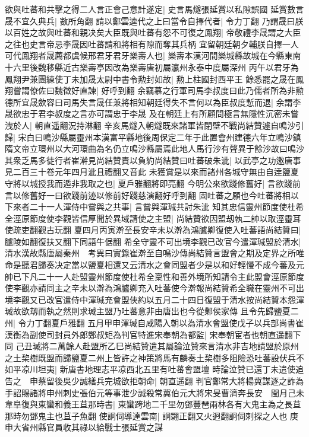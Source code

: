 欲與吐蕃和共擊之得二人言正會己意計遂定|{
	史言馬燧張延賞以私隙誤國}
延賞數言晟不宜久典兵|{
	數所角翻}
請以鄭雲逵代之上曰當令自擇代者|{
	令力丁翻}
乃謂晟曰朕以百姓之故與吐蕃和親决矣大臣既與吐蕃有怨不可復之鳳翔|{
	帝敬禮李晟謂之大臣之往也史言帝忌李晟因吐蕃請和將相有隙而奪其兵柄}
宜留朝廷朝夕輔朕自擇一人可代鳳翔者晟薦都虞候邢君牙君牙樂壽人也|{
	樂壽本漢河間樂城縣故城在今縣東南十六里後魏移縣近古樂壽亭因改為樂壽唐初屬瀛州永泰中度屬深州}
丙午以君牙為鳳翔尹兼團練使丁未加晟太尉中書令勲封如故|{
	勲上柱國封西平王}
餘悉罷之晟在鳳翔嘗謂僚佐曰魏徵好直諫|{
	好呼到翻}
余竊慕之行軍司馬李叔度曰此乃儒者所為非勲德所宜晟歛容曰司馬失言晟任兼將相知朝廷得失不言何以為臣叔度慙而退|{
	余謂李晟欲忠于君李叔度之言亦可謂忠于李晟}
及在朝廷上有所顧問極言無隱性沉密未嘗洩於人|{
	朝直遥翻況持淋翻}
辛亥馬燧入朝燧既來諸軍皆閉壁不戰尚結贊遽自鳴沙引歸|{
	宋白曰鳴沙縣屬靈州本漢富平縣地後周保定二年于此置會州建德六年立鳴沙鎮隋文帝立環州以大河環曲為名仍立鳴沙縣屬焉此地人馬行沙有聲異于餘沙故曰鳴沙}
其衆乏馬多徒行者崔澣見尚結贊責以負約尚結贊曰吐蕃破朱泚|{
	以武亭之功邀唐事見二百三十卷元年四月泚且禮翻又音此}
未獲賞是以來而諸州各城守無由自逹鹽夏守將以城授我而遁非我取之也|{
	夏戶雅翻將即亮翻}
今明公來欲踐修舊好|{
	言欲踐前言以修舊好一曰欲踐前迹以修前好踐慈演翻好呼到翻}
固吐蕃之願也今吐蕃將相以下來者二十一人渾侍中嘗與之共事|{
	言嘗與渾瑊共討朱泚}
知其忠信靈州節度使杜希全涇原節度使李觀皆信厚聞於異域請使之主盟|{
	尚結贊欲因盟刼執二帥以取涇靈耳使疏吏翻觀古玩翻}
夏四月丙寅澣至長安辛未以澣為鴻臚卿復使入吐蕃語尚結贊曰|{
	臚陵如翻復扶又翻下同語牛倨翻}
希全守靈不可出境李觀已改官今遣渾瑊盟於清水|{
	清水漢故縣唐屬秦州　考異曰實錄崔澣至自鳴沙傳尚結贊言盟會之期及定界之所唯命是聽君歸奏决定當以鹽夏相還又云清水之會同盟者少是以和好輕慢不成今蕃及元帥已下凡二十一人赴盟靈州節度使杜希全稟性和善外境所知請令主此盟會涇原節度使李觀亦請同主之辛未以澣為鴻臚卿充入吐蕃使今澣報尚結贊希全職在靈州不可出境李觀又已改官遣侍中渾瑊充會盟俠約以五月二十四日復盟于清水按尚結贊本怨渾瑊故欲刼而執之然則求瑊主盟乃吐蕃意非由唐出也今從鄴侯家傳}
且令先歸鹽夏二州|{
	令力丁翻夏戶雅翻}
五月甲申渾瑊自咸陽入朝以為清水會盟使戊子以兵部尚書崔漢衡為副使司封員外郎鄭叔矩為判官特進宋奉朝為都監|{
	宋奉朝宦者也朝直遥翻下同}
己丑瑊將二萬餘人赴盟所乙巳尚結贊遣其屬論泣贊來言清水非吉地請盟於原州之土棃樹既盟而歸鹽夏二州上皆許之神策將馬有麟奏土棃樹多阻險恐吐蕃設伏兵不如平凉川坦夷|{
	新唐書地理志平凉西北五里有吐蕃會盟壇}
時論泣贊已還丁未遣使追告之　申蔡留後吳少誠繕兵完城欲拒朝命|{
	朝直遥翻}
判官鄭常大將楊冀謀逐之詐為手詔賜諸將申州刺史張伯元等事泄少誠殺常冀伯元大將宋旻曹濟奔長安　閠月己未韋臯復與東蠻和義王苴那時書|{
	東蠻跨地二千里勿鄧豐琶兩林各有大鬼主為之長苴那時勿鄧鬼主也苴子魚翻}
使詗伺導達雲南|{
	詗翾正翻又火迥翻詗伺刺探之人也}
庚申大省州縣官員收其祿以給戰士張延賞之謀

